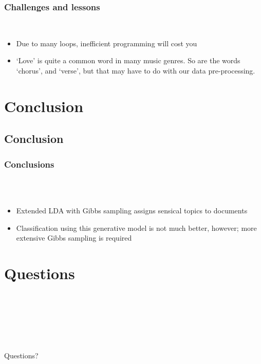 \documentclass[t,ignorenonframetext]{beamer}
\begin{document}
\begin{frame}
\frametitle{Challenges and lessons}~\\
\begin{itemize}
	\item Due to many loops, inefficient programming will cost you
	\item `Love' is quite a common word in many music genres. So are the words `chorus', and `verse', but that may have to do with our data pre-processing.
\end{itemize}
\end{frame}

\section{Conclusion}
\subsection{Conclusion}
\begin{frame}
\frametitle{Conclusions}~\\~\\
\begin{itemize}
\setlength{\itemsep}{10pt}\setlength{\itemsep}{5pt}
\item Extended LDA with Gibbs sampling assigns sensical topics to documents
\item Classification using this generative model is not much better, however; more extensive Gibbs sampling is required 

\end{itemize}
\end{frame}

\section[Questions]{Questions}
\begin{frame}
~ \\~ \\~ \\ ~ \\~ \\
\begin{center}\Huge Questions? \end{center} 
\end{frame}
\end{document}
